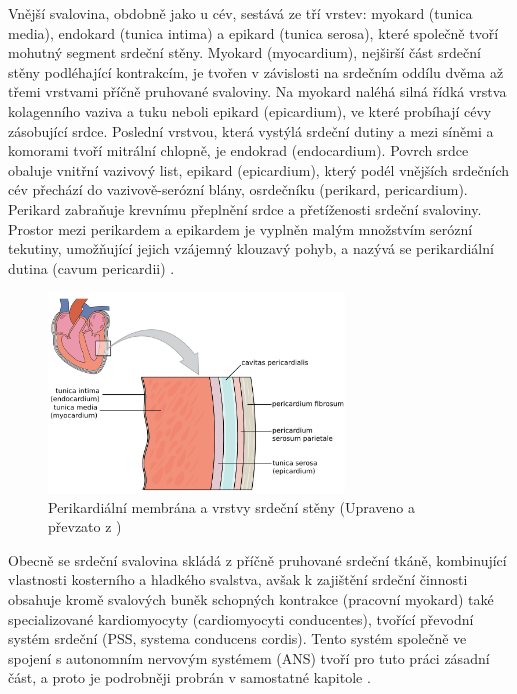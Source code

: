 Vnější svalovina, obdobně jako u cév, sestává ze tří vrstev: myokard (tunica
media), endokard (tunica intima) a epikard (tunica serosa), které společně tvoří
mohutný segment srdeční stěny. Myokard (myocardium), nejširší část srdeční stěny
podléhající kontrakcím, je tvořen v závislosti na srdečním oddílu dvěma až třemi
vrstvami příčně pruhované svaloviny. Na myokard naléhá silná řídká vrstva
kolagenního vaziva a tuku neboli epikard (epicardium), ve které probíhají cévy
zásobující srdce. Poslední vrstvou, která vystýlá srdeční dutiny a mezi síněmi a
komorami tvoří mitrální chlopně, je endokrad (endocardium). Povrch srdce obaluje
vnitřní vazivový list, epikard (epicardium), který podél vnějších srdečních cév
přechází do vazivově-serózní blány, osrdečníku (perikard, pericardium). Perikard
zabraňuje krevnímu přeplnění srdce a přetíženosti srdeční svaloviny. Prostor
mezi perikardem a epikardem je vyplněn malým množstvím serózní tekutiny,
umožňující jejich vzájemný klouzavý pohyb, a nazývá se perikardiální dutina
(cavum pericardii) \cite{Memorix2017,Weinhaus2005,Dylevsky2013}.

\begin{figure}[h]
	\begin{center}
		\includegraphics[width=0.7\textwidth]{../assets/anatomy/heart_muscle}
		\caption{Perikardiální membrána a vrstvy srdeční stěny (Upraveno a
			převzato z \cite{OpenStax})}
		\label{img:heartlayers}
	\end{center}
\end{figure}

Obecně se srdeční svalovina skládá z příčně pruhované srdeční tkáně, kombinující
vlastnosti kosterního a hladkého svalstva, avšak k zajištění srdeční činnosti
obsahuje kromě svalových buněk schopných kontrakce (pracovní myokard) také
specializované kardiomyocyty (cardiomyocyti conducentes), tvořící převodní
systém srdeční (PSS, systema conducens cordis). Tento systém společně ve spojení
s autonomním nervovým systémem (ANS) tvoří pro tuto práci zásadní část, a proto
je podrobněji probrán v samostatné kapitole \cite{Memorix2017,Dylevsky2013}.

